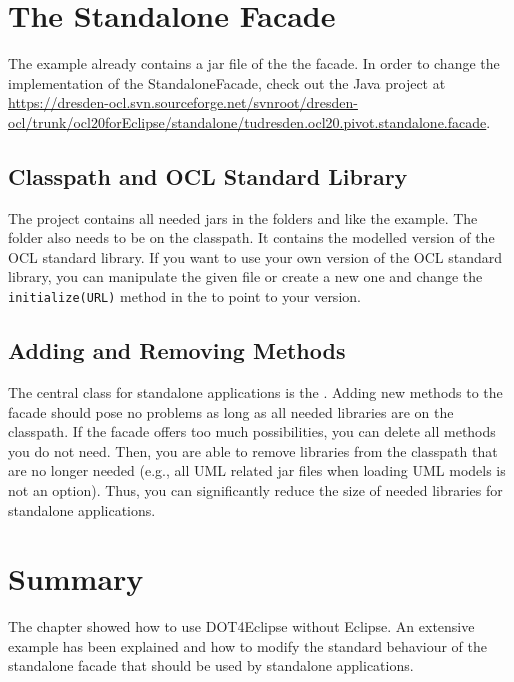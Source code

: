 \section{The Standalone Facade}

The example already contains a jar file of the the facade. In order to change the implementation of the StandaloneFacade, check out the Java project at \url{https://dresden-ocl.svn.sourceforge.net/svnroot/dresden-ocl/trunk/ocl20forEclipse/standalone/tudresden.ocl20.pivot.standalone.facade}.

\subsection{Classpath and OCL Standard Library}
The project contains all needed jars in the folders  and  like the example. The  folder also needs to be on the classpath. It contains the modelled version of the OCL standard library. If you want to use your own version of the OCL standard library, you can manipulate the given file or create a new one and change the \lstinline[breaklines=true]{initialize(URL)} method in the  to point to your version.

\subsection{Adding and Removing Methods}
The central class for standalone applications is the . Adding new methods to the facade should pose no problems as long as all needed libraries are on the classpath. If the facade offers too much possibilities, you can delete all methods you do not need. Then, you are able to remove libraries from the classpath that are no longer needed (e.g., all UML related jar files when loading UML models is not an option). Thus, you can significantly reduce the size of needed libraries for standalone applications.


\section{Summary}

The chapter showed how to use \acl{DOT4Eclipse} without Eclipse. An extensive example has been explained and how to modify the standard behaviour of the standalone facade that should be used by standalone applications.